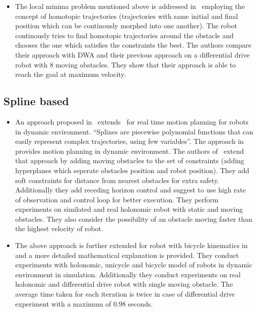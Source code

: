 \begin{itemize}
    \item The local minima problem mentioned above is addressed in~\cite{rosmann2015planning} employing
        the concept of homotopic trajectories (trajectories with same initial and final position which
        can be continously morphed into one another). The robot continously tries to find homotopic 
        trajectories around the obstacle and chooses the one which satisfies the constraints the best.
        The authors compare their approach with DWA and their previous approach\cite{rosmann2013efficient}
        on a differential drive robot with 8 moving obstacles. They show that their approach is able to 
        reach the goal at maximum velocity.
\end{itemize}

\subsection{Spline based}%
\label{sub:spline_based}

\begin{itemize}
    \item An approach proposed in~\cite{mercy2016real} extends~\cite{loock2015b} for real time motion
        planning for robots in dynamic environment. ``Splines are piecewise polynomial functions 
        that can easily represent complex trajectories, using few variables''\cite{mercy2016real}. 
        The approach in~\cite{loock2015b} provides motion planning in dynamic environment. The 
        authors of~\cite{mercy2016real} extend that approach by adding moving obstacles to the set
        of constraints (adding hyperplanes which seperate obstacles position and robot position). 
        They add soft constraints for distance from nearest obstacles for extra safety. Additionally
        they add receding horizon control and suggest to use high rate of observation and control 
        loop for better execution. They perform experiments on similated and real holonomic robot
        with static and moving obstacles. They also consider the possibility of an obstacle moving
        faster than the highest velocity of robot. 

    \item The above approach is further extended for robot with bicycle kinematics in~\cite{mercy2017spline}
        and a more detailed mathematical explanation is provided. They conduct experiments with 
        holonomic, unicycle and bicycle model of robots in dynamic environment in simulation. 
        Additionally they conduct experiments on real holonomic and differential drive robot with 
        single moving obstacle. The average time taken for each iteration is twice in case of differential
        drive experiment with a maximum of 0.98 seconds.
\end{itemize}


